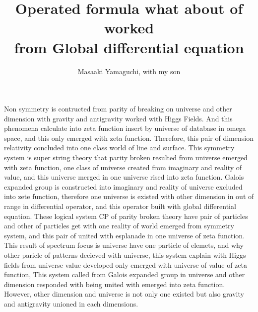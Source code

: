\documentclass{jsarticle}
\begin{document}
\title{Operated formula what about of worked \\
from Global differential equation }
\author{Masaaki Yamaguchi, with my son}
\date{}
\maketitle

  Non symmetry is contructed from parity of breaking on universe and
other dimension with gravity and antigravity worked with Higgs Fields.
And this phenomena calculate into zeta function insert by universe of 
database in omega space, and this only emerged with zeta function.
Therefore, this pair of dimension relativity concluded into one class
world of line and surface. This symmetry system is super string theory
that parity broken resulted from universe emerged with zeta function,
one class of universe created from imaginary and reality of value,
and this universe merged in one universe rised into zeta function.
Galois expanded group is constructed into imaginary and reality of universe
excluded into zete function, therefore one universe is existed with
other dimension in out of range in differential operator, and this operator
built with global differential equation.
These logical system CP of parity broken theory have pair of 
particles and other of particles get with one 
reality of world emerged from symmetry system,
and this pair of united with esplanade in one universe of zeta function.
This result of spectrum focus is universe have one particle of elemets,
and why other paricle of patterns decieved with universe,
this system explain with Higgs fields from universe value developed 
only emerged with universe of value of zeta function,
This system called from Galois expanded group in universe and 
other dimension responded with being united with emerged into zeta function.
However, other dimension and universe is not only one existed but also
gravity and antigravity unioned in each dimensions.
\end{document}
